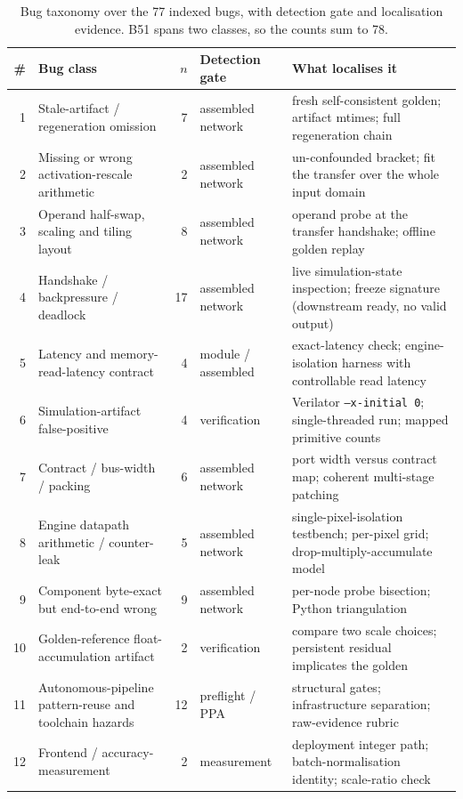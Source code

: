 \documentclass[acmtog,authorversion]{acmart}
\begin{document}
\begin{table}[t]
\centering
\caption{Bug taxonomy over the 77 indexed bugs, with detection gate and localisation evidence. B51 spans two classes, so the counts sum to 78.}
\label{tab:taxonomy}
\begin{tabular}{@{}r p{} r p{} p{}@{}}
\toprule
\# & Bug class & $n$ & Detection gate & What localises it \\
\midrule
1 & Stale-artifact / regeneration omission & 7 & assembled network & fresh self-consistent golden; artifact mtimes; full regeneration chain \\
2 & Missing or wrong activation-rescale arithmetic & 2 & assembled network & un-confounded bracket; fit the transfer over the whole input domain \\
3 & Operand half-swap, scaling and tiling layout & 8 & assembled network & operand probe at the transfer handshake; offline golden replay \\
4 & Handshake / backpressure / deadlock & 17 & assembled network & live simulation-state inspection; freeze signature (downstream ready, no valid output) \\
5 & Latency and memory-read-latency contract & 4 & module / assembled & exact-latency check; engine-isolation harness with controllable read latency \\
6 & Simulation-artifact false-positive & 4 & verification & Verilator \texttt{--x-initial 0}; single-threaded run; mapped primitive counts \\
7 & Contract / bus-width / packing & 6 & assembled network & port width versus contract map; coherent multi-stage patching \\
8 & Engine datapath arithmetic / counter-leak & 5 & assembled network & single-pixel-isolation testbench; per-pixel grid; drop-multiply-accumulate model \\
9 & Component byte-exact but end-to-end wrong & 9 & assembled network & per-node probe bisection; Python triangulation \\
10 & Golden-reference float-accumulation artifact & 2 & verification & compare two scale choices; persistent residual implicates the golden \\
11 & Autonomous-pipeline pattern-reuse and toolchain hazards & 12 & preflight / PPA & structural gates; infrastructure separation; raw-evidence rubric \\
12 & Frontend / accuracy-measurement & 2 & measurement & deployment integer path; batch-normalisation identity; scale-ratio check \\
\bottomrule
\end{tabular}
\end{table}
\end{document}
